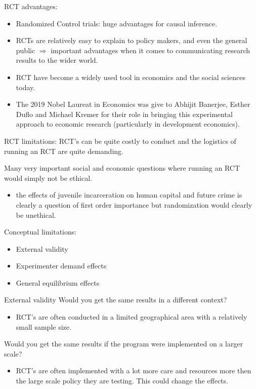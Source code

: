 \documentclass[
  ignorenonframetext,
]{beamer}
\providecommand{\tightlist}{%
  \setlength{\itemsep}{0pt}\setlength{\parskip}{0pt}}
\begin{document}
\begin{frame}{RCT advantages:}
\protect\hypertarget{rct-advantages}{}
\begin{itemize}
\item
  Randomized Control trials: huge advantages for causal inference.
\item
  RCTs are relatively easy to explain to policy makers, and even the
  general public \(\Rightarrow\) important advantages when it comes to
  communicating research results to the wider world.
\item
  RCT have become a widely used tool in economics and the social
  sciences today.
\item
  The 2019 Nobel Laureat in Economics was give to Abhijit Banerjee,
  Esther Duflo and Michael Kremer for their role in bringing this
  experimental approach to economic research (particularly in
  development economics).
\end{itemize}
\end{frame}

\begin{frame}{RCT limitations:}
\protect\hypertarget{rct-limitations}{}
RCT's can be quite costly to conduct and the logistics of running an RCT
are quite demanding.

Many very important social and economic questions where running an RCT
would simply not be ethical.

\begin{itemize}
\tightlist
\item
  the effects of juvenile incarceration on human capital and future
  crime is clearly a question of first order importance but
  randomization would clearly be unethical.
\end{itemize}

Conceptual limitations:

\begin{itemize}
\item
  External validity
\item
  Experimenter demand effects
\item
  General equilibrium effects
\end{itemize}
\end{frame}

\begin{frame}{External validity}
\protect\hypertarget{external-validity}{}
Would you get the same results in a different context?

\begin{itemize}
\tightlist
\item
  RCT's are often conducted in a limited geographical area with a
  relatively small sample size.
\end{itemize}

Would you get the same results if the program were implemented on a
larger scale?

\begin{itemize}
\tightlist
\item
  RCT's are often implemented with a lot more care and resources more
  then the large scale policy they are testing. This could change the
  effects.
\end{itemize}
\end{frame}
\end{document}

